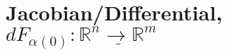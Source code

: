 \documentclass[12pt]{article}
\begin{document}
\newpage
\section{Jacobian/Differential, \( dF_{\alpha(0)} : \underline{ \mathbb{R}^n \rightarrow \mathbb{R}^m } \) }
\end{document}
